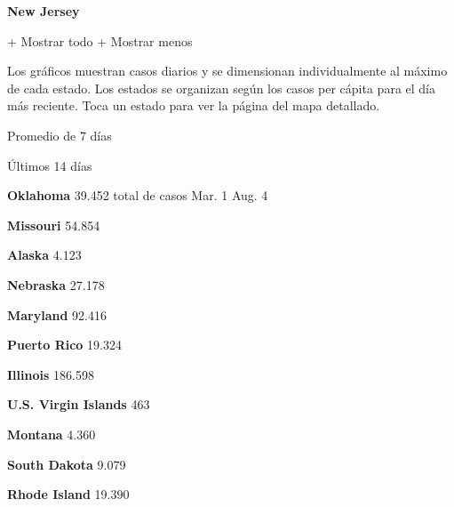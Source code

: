 \textbf{New Jersey}

+ Mostrar todo + Mostrar menos

Los gráficos muestran casos diarios y se dimensionan individualmente al
máximo de cada estado. Los estados se organizan según los casos per
cápita para el día más reciente. Toca un estado para ver la página del
mapa detallado.

\href{https://www.nytimes3xbfgragh.onion/interactive/2020/us/oklahoma-coronavirus-cases.html}{}

Promedio de 7 días

Últimos 14 días

\textbf{Oklahoma} 39.452 total de casos Mar. 1 Aug. 4

\href{https://www.nytimes3xbfgragh.onion/interactive/2020/us/missouri-coronavirus-cases.html}{}

\textbf{Missouri} 54.854

\href{https://www.nytimes3xbfgragh.onion/interactive/2020/us/alaska-coronavirus-cases.html}{}

\textbf{Alaska} 4.123

\href{https://www.nytimes3xbfgragh.onion/interactive/2020/us/nebraska-coronavirus-cases.html}{}

\textbf{Nebraska} 27.178

\href{https://www.nytimes3xbfgragh.onion/interactive/2020/us/maryland-coronavirus-cases.html}{}

\textbf{Maryland} 92.416

\href{https://www.nytimes3xbfgragh.onion/interactive/2020/us/puerto-rico-coronavirus-cases.html}{}

\textbf{Puerto Rico} 19.324

\href{https://www.nytimes3xbfgragh.onion/interactive/2020/us/illinois-coronavirus-cases.html}{}

\textbf{Illinois} 186.598

\textbf{U.S. Virgin Islands} 463

\href{https://www.nytimes3xbfgragh.onion/interactive/2020/us/montana-coronavirus-cases.html}{}

\textbf{Montana} 4.360

\href{https://www.nytimes3xbfgragh.onion/interactive/2020/us/south-dakota-coronavirus-cases.html}{}

\textbf{South Dakota} 9.079

\href{https://www.nytimes3xbfgragh.onion/interactive/2020/us/rhode-island-coronavirus-cases.html}{}

\textbf{Rhode Island} 19.390

